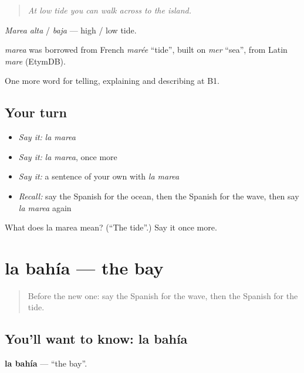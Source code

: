 \begin{quote}
\emph{At low tide you can walk across to the island.}
\end{quote}

\emph{Marea alta} / \emph{baja} — high / low tide.

\begin{cousinweb}
\emph{marea} was borrowed from French \emph{marée} \textquotedblleft{}tide\textquotedblright{}, built on \emph{mer} \textquotedblleft{}sea\textquotedblright{}, from Latin \emph{mare} (EtymDB).
\end{cousinweb}

\begin{grammarlens}[title={What you've built}]
One more word for telling, explaining and describing at B1.
\end{grammarlens}

\subsection*{Your turn}
\begin{itemize}
\raggedright
  \item \emph{Say it:} \emph{la marea}
  \item \emph{Say it:} \emph{la marea}, once more
  \item \emph{Say it:} a sentence of your own with \emph{la marea}
  \item \emph{Recall:} say the Spanish for the ocean, then the Spanish for the wave, then say \emph{la marea} again
\end{itemize}

\begin{tcolorbox}[breakable,colback=teal!4,colframe=teal!35!black,title={Before you move on}]
What does la marea mean? (\textquotedblleft{}The tide\textquotedblright{}.) Say it once more.
\end{tcolorbox}
\section[la bahía]{la bahía — the bay}

\label{lesson:ES-C688-bahia}



\begin{quote}
Before the new one: say the Spanish for the wave, then the Spanish for the tide.
\end{quote}

\subsection*{You'll want to know: la bahía}
\textbf{la bahía} — \textquotedblleft{}the bay\textquotedblright{}.


